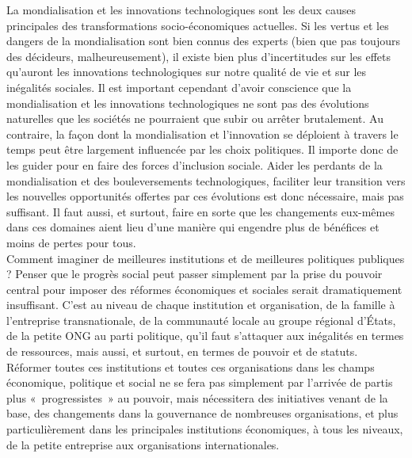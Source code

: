 \documentclass[8pt]{article}
\begin{document}
La mondialisation et les innovations technologiques sont les deux causes principales des transformations socio-économiques actuelles. Si les vertus et les dangers de la mondialisation sont bien connus des experts (bien que pas toujours des décideurs, malheureusement), il existe bien plus d’incertitudes sur les effets qu’auront les innovations technologiques sur notre qualité de vie et sur les inégalités sociales. Il est important cependant d’avoir conscience que la mondialisation et les innovations technologiques ne sont pas des évolutions naturelles que les sociétés ne pourraient que subir ou arrêter brutalement. Au contraire, la façon dont la mondialisation et l’innovation se déploient à travers le temps peut être largement influencée par les choix politiques. Il importe donc de les guider pour en faire des forces d’inclusion sociale. Aider les perdants de la mondialisation et des bouleversements technologiques, faciliter leur transition vers les nouvelles opportunités offertes par ces évolutions est donc nécessaire, mais pas suffisant. Il faut aussi, et surtout, faire en sorte que les changements eux-mêmes dans ces domaines aient lieu d’une manière qui engendre plus de bénéfices et moins de pertes pour tous.\\

Comment imaginer de meilleures institutions et de meilleures politiques publiques ? Penser que le progrès social peut passer simplement par la prise du pouvoir central pour imposer des réformes économiques et sociales serait dramatiquement insuffisant. C’est au niveau de chaque institution et organisation, de la famille à l’entreprise transnationale, de la communauté locale au groupe régional d’États, de la petite ONG au parti politique, qu’il faut s’attaquer aux inégalités en termes de ressources, mais aussi, et surtout, en termes de pouvoir et de statuts. Réformer toutes ces institutions et toutes ces organisations dans les champs économique, politique et social ne se fera pas simplement par l’arrivée de partis plus «\ progressistes\ » au pouvoir, mais nécessitera des initiatives venant de la base, des changements dans la gouvernance de nombreuses organisations, et plus particulièrement dans les principales institutions économiques, à tous les niveaux, de la petite entreprise aux organisations internationales.
\end{document}
